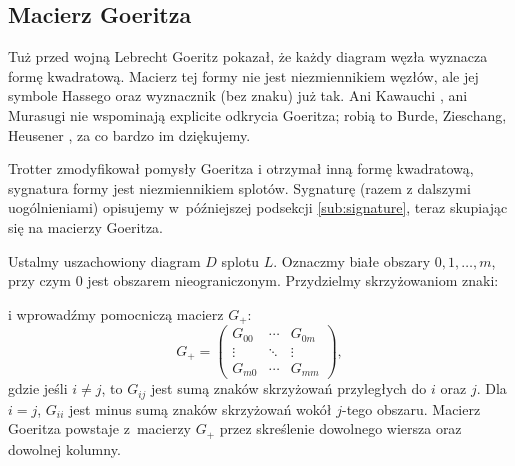 
\subsection{Macierz Goeritza}
%
Tuż przed wojną Lebrecht Goeritz \cite{goeritz1933} pokazał, że każdy diagram węzła wyznacza formę kwadratową.
Macierz tej formy nie jest niezmiennikiem węzłów, ale jej symbole Hassego oraz wyznacznik (bez znaku) już tak.
%
Ani Kawauchi \cite{kawauchi1996}, ani Murasugi \cite{murasugi1996} nie wspominają explicite odkrycia Goeritza; robią to Burde, Zieschang, Heusener \cite[s. 258-262]{burde2014}, za co bardzo im dziękujemy.

Trotter zmodyfikował pomysły Goeritza i otrzymał inną formę kwadratową, sygnatura formy jest niezmiennikiem splotów.
%
Sygnaturę (razem z dalszymi uogólnieniami) opisujemy w~późniejszej podsekcji \ref{sub:signature}, teraz skupiając się na macierzy Goeritza.

\begin{definition}
    Ustalmy uszachowiony diagram $D$ splotu $L$.
    Oznaczmy białe obszary $0, 1, \ldots, m$, przy czym $0$ jest obszarem nieograniczonym.
    Przydzielmy skrzyżowaniom znaki:
\begin{comment}
    \begin{figure}[H]
        \begin{minipage}[b]{.48\linewidth}
        \centering
            \MedLarPlusCrossingChessboard
        \end{minipage}
        \begin{minipage}[b]{.48\linewidth}
        \centering
        \MedLarMinusCrossingChessboard
        \end{minipage}
    \end{figure}
\end{comment}
\noindent
i wprowadźmy pomocniczą macierz $G_+$:
    \begin{equation}
        G_+=\begin{pmatrix}
        G_{00} & \cdots & G_{0m} \\
        \vdots & \ddots & \vdots \\
        G_{m0} & \cdots & G_{mm}
        \end{pmatrix},
    \end{equation}
    gdzie jeśli $i\neq j$, to $G_{ij}$ jest sumą znaków skrzyżowań przyległych do $i$ oraz $j$.
    Dla $i = j$, $G_{ii}$ jest minus sumą znaków skrzyżowań wokół $j$-tego obszaru.
    Macierz Goeritza powstaje z~macierzy $G_+$ przez skreślenie dowolnego wiersza oraz dowolnej kolumny.
\end{definition}

